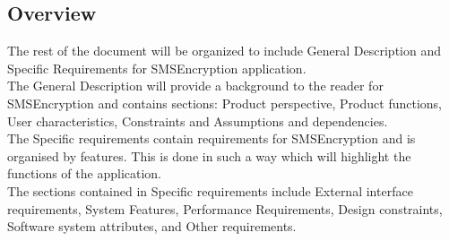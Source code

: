 \subsection{Overview}
The rest of the document will be organized to include General Description and Specific Requirements for SMSEncryption application.
\vspace{10pt}\\
The General Description will provide a background to the reader for SMSEncryption and contains sections: Product perspective, Product functions, User characteristics, Constraints and Assumptions and dependencies.
\vspace{10pt}\\
The Specific requirements contain requirements for SMSEncryption and is organised by features. This is done in such a way which will highlight the functions of the application. 
\vspace{10pt}\\
The sections contained in Specific requirements include External interface requirements, System Features, Performance Requirements, Design constraints, Software system attributes, and Other requirements.
\vspace{10pt}


